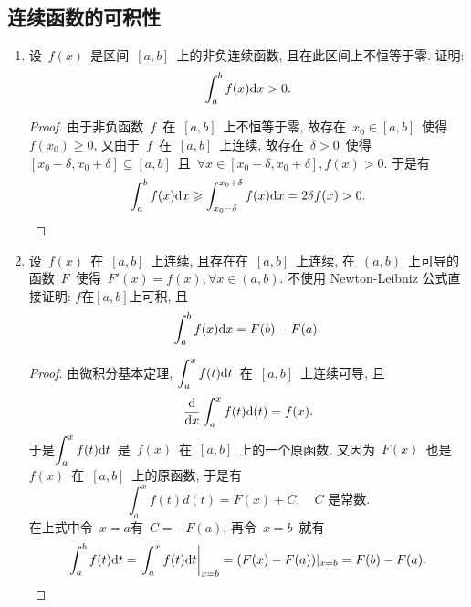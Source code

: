 \documentclass[UTF8,a4paper,20pt]{article}
\begin{document}
\clearpage
\subsection{连续函数的可积性}
\begin{enumerate}
\item 设~$f(x)$~是区间~$[a,b]$~上的非负连续函数, 且在此区间上不恒等于零. 证明:
\[ \int_a^b f(x)\mathrm{d}x>0.\]
\begin{proof}
由于非负函数~$f$~在~$[a,b]$~上不恒等于零, 故存在~$x_0\in[a,b]$~使得~$f(x_0)\geqslant 0$, 又由于~$f$~在~$[a,b]$~上连续, 故存在~$\delta>0$~使得$[x_0-\delta,x_0+\delta]\subseteq [a,b]$~且~$\forall x\in [x_0-\delta,x_0+\delta], f(x)>0$. 于是有
\[ \int_a^b f(x)\mathrm{d}x \geqslant \int_{x_0-\delta}^{x_0+\delta}f(x)\mathrm{d}x=2\delta f(x)>0.\]
\end{proof}

\item 设~$f(x)$~在~$[a,b]$~上连续, 且存在在~$[a,b]$~上连续, 在~$(a,b)$~上可导的函数~$F$~使得~$F'(x)=f(x), \forall x\in(a,b)$. 不使用 Newton-Leibniz 公式直接证明: $f$在$[a,b]$上可积, 且
\[ \int_a^b f(x)\mathrm{d}x=F(b)-F(a).\]
\begin{proof}
由微积分基本定理, $\displaystyle \int_a^x f(t)\mathrm{d}t$~在~$[a,b]$~上连续可导, 且
\[\dfrac{\ud}{\ud{x}}\int_a^x f(t)\ud(t)=f(x).\]
于是$\displaystyle \int_a^xf(t)\mathrm{d}t$~是~$f(x)$~在~$[a,b]$~上的一个原函数. 又因为~$F(x)$~也是~$f(x)$~在~$[a,b]$~上的原函数, 于是有
\[\int_a^xf(t)d(t)=F(x)+C, \quad\text{$C$~是常数.}\]
在上式中令~$x=a$有~$C=-F(a)$, 再令~$x=b$~就有
\[\int_a^bf(t)\mathrm{d}t=\left.\int_a^xf(t)\mathrm{d}t\right|_{x=b}=(F(x)-F(a))|_{x=b}=F(b)-F(a).\]
\end{proof}


\end{enumerate}
\end{document}
